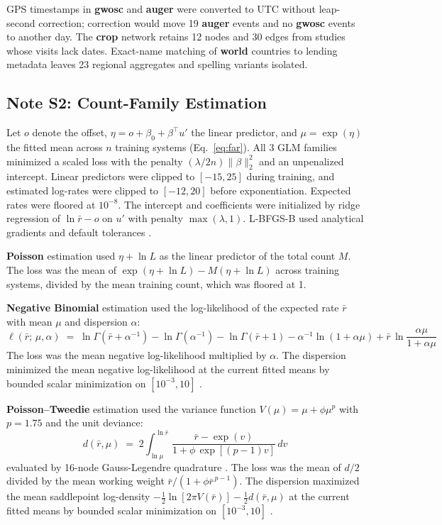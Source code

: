 \documentclass{article}
\begin{document}
GPS timestamps in \textbf{gwosc} and \textbf{auger} were converted to UTC without leap-second correction; correction would move 19 \textbf{auger} events and no \textbf{gwosc} events to another day. The \textbf{crop} network retains 12 nodes and 30 edges from studies whose visits lack dates. Exact-name matching of \textbf{world} countries to lending metadata leaves 23 regional aggregates and spelling variants isolated.

\clearpage
\subsection*{Note S2: Count-Family Estimation}
\label{sec:si-note-estimation}
Let $o$ denote the offset, $\eta = o + \beta_0 + \beta^{\top}u'$ the linear predictor, and $\mu = \exp(\eta)$ the fitted mean across $n$ training systems (Eq.~\eqref{eq:far}). All 3 GLM families minimized a scaled loss with the penalty $(\lambda/2n)\lVert\beta\rVert_2^2$ and an unpenalized intercept. Linear predictors were clipped to $[-15, 25]$ during training, and estimated log-rates were clipped to $[-12, 20]$ before exponentiation. Expected rates were floored at $10^{-8}$. The intercept and coefficients were initialized by ridge regression of $\ln \bar{r} - o$ on $u'$ with penalty $\max(\lambda, 1)$. L-BFGS-B used analytical gradients and default tolerances \citep{ref145}.

\textbf{Poisson} estimation used $\eta + \ln L$ as the linear predictor of the total count $M$. The loss was the mean of $\exp(\eta + \ln L) - M(\eta + \ln L)$ across training systems, divided by the mean training count, which was floored at 1.

\textbf{Negative Binomial} estimation used the log-likelihood of the expected rate $\bar{r}$ with mean $\mu$ and dispersion $\alpha$:
\begin{equation*}
\ell(\bar{r};\, \mu, \alpha) \;=\; \ln\Gamma(\bar{r} + \alpha^{-1}) - \ln\Gamma(\alpha^{-1}) - \ln\Gamma(\bar{r} + 1) - \alpha^{-1}\ln(1 + \alpha\mu) + \bar{r}\,\ln\frac{\alpha\mu}{1 + \alpha\mu}
\end{equation*}
The loss was the mean negative log-likelihood multiplied by $\alpha$. The dispersion minimized the mean negative log-likelihood at the current fitted means by bounded scalar minimization on $[10^{-3}, 10]$ \citep{ref184}.

\textbf{Poisson--Tweedie} estimation used the variance function $V(\mu) = \mu + \phi\mu^{p}$ with $p = 1.75$ and the unit deviance:
\begin{equation*}
d(\bar{r}, \mu) \;=\; 2\int_{\ln \mu}^{\ln \bar{r}} \frac{\bar{r} - \exp(v)}{1 + \phi\, \exp[(p - 1)v]}\, dv
\end{equation*}
evaluated by 16-node Gauss-Legendre quadrature \citep{ref174}. The loss was the mean of $d/2$ divided by the mean working weight $\bar{r}/(1 + \phi\bar{r}^{\,p-1})$. The dispersion maximized the mean saddlepoint log-density $-\tfrac{1}{2}\ln[2\pi V(\bar{r})] - \tfrac{1}{2}d(\bar{r}, \mu)$ at the current fitted means by bounded scalar minimization on $[10^{-3}, 10]$ \citep{ref173,ref144}.
\end{document}
